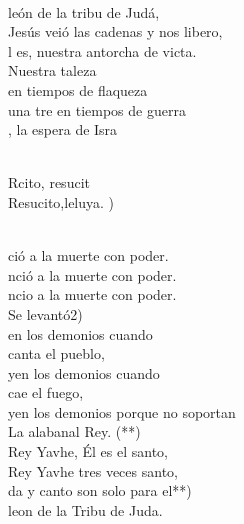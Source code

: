 \begin{cancion}%
	     \chord{(}{**)}{    }\\
	león de la tribu de Judá,\\
	Jesús veió las cadenas y nos libero,\\
	l es, nuestra antorcha de victa.\\
	Nuestra taleza \\
en tiempos de flaqueza \\
	una tre en tiempos de guerra\\
	, la espera de Isra\\\jump\\
	\begin{chorus}%
	Rcito, resucit \\
	Resucito,leluya. )\\
	\end{chorus}%
	\jump\\
	ció a la muerte con poder.\\
	nció a la muerte con poder.\\
	ncio a la muerte con poder.\\
	Se levantó2) \\
\jump
	en los demonios cuando \\
canta el pueblo,\\
	yen los demonios cuando \\
cae el fuego,\\
	yen los demonios porque no soportan\\
	La alabanal Rey. (**)\\
\jump
	 Rey Yavhe, Él es el santo,\\
	 Rey Yavhe tres veces santo,\\
	da y canto son solo para el**)\\
\jump
	leon de la Tribu de Juda.\\
\end{cancion}%
